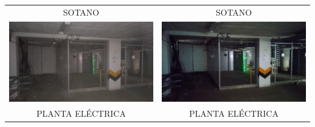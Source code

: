 \documentclass[12pt,a4paper,twoside]{article}
\begin{document}
\begin{tabular}{ c c }
	SOTANO & SOTANO \\
	\includegraphics[width = 7 cm]{Imagenes/44} & \includegraphics[width = 7 cm]{Imagenes/42} \\
	PLANTA ELÉCTRICA & PLANTA ELÉCTRICA\\
	
%	
\end{tabular}
%
\end{document}
